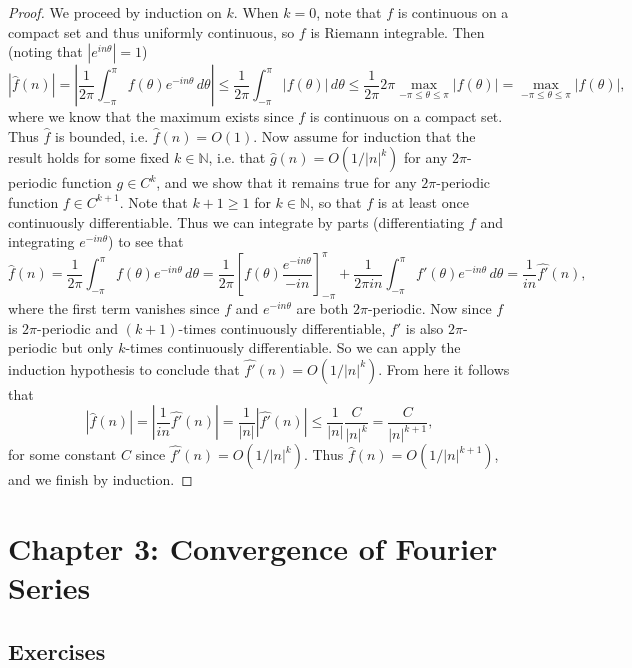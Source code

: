 \documentclass[letterpaper, 12pt]{article}
\newcommand{\N}{\mathbb{N}}
\begin{document}
\begin{proof}
  We proceed by induction on $k$. When $k = 0$, note that
  $f$ is continuous on a compact set and thus uniformly
  continuous, so $f$ is Riemann integrable. Then
  (noting that $|e^{in\theta}| = 1$)
  \[
    |\hat{f}(n)|
    = \left|\frac{1}{2\pi} \int_{-\pi}^{\pi} f(\theta) e^{-in\theta}\, d\theta \right|
    \le \frac{1}{2\pi} \int_{-\pi}^{\pi} |f(\theta)|\, d\theta
    \le \frac{1}{2\pi} 2\pi \max_{-\pi \le \theta \le \pi} |f(\theta)|
    = \max_{-\pi \le \theta \le \pi} |f(\theta)|,
  \]
  where we know that the maximum exists since $f$ is
  continuous on a compact set. Thus $\hat{f}$ is bounded,
  i.e. $\hat{f}(n) = O(1)$. Now assume for induction
  that the result
  holds for some fixed $k \in \N$, i.e.
  that $\hat{g}(n) = O(1 / |n|^k)$ for any $2\pi$-periodic
  function $g \in C^k$, and we show that
  it remains true for any $2\pi$-periodic function
  $f \in C^{k + 1}$. Note that $k + 1 \ge 1$ for
  $k \in \N$, so that
  $f$ is at least once continuously differentiable.
  Thus we can integrate by parts
  (differentiating $f$ and integrating $e^{-in\theta}$)
  to see that
  \[
    \hat{f}(n)
    = \frac{1}{2\pi} \int_{-\pi}^{\pi} f(\theta) e^{-in\theta}\, d\theta
    = \frac{1}{2\pi} \left[f(\theta) \frac{e^{-in\theta}}{-in}\right]_{-\pi}^{\pi}
    + \frac{1}{2\pi in} \int_{-\pi}^{\pi} f'(\theta) e^{-in\theta}\, d\theta
    = \frac{1}{in} \widehat{f'}(n),
  \]
  where the first term vanishes since
  $f$ and $e^{-in\theta}$ are both $2\pi$-periodic.
  Now since $f$ is $2\pi$-periodic and $(k + 1)$-times
  continuously differentiable, $f'$ is also
  $2\pi$-periodic but only $k$-times continuously
  differentiable. So we can apply the induction
  hypothesis to conclude that
  $\widehat{f'}(n) = O(1 / |n|^k)$. From here it follows
  that
  \[
    |\hat{f}(n)|
    = \left|\frac{1}{in} \widehat{f'}(n)\right|
    = \frac{1}{|n|} \left|\widehat{f'}(n)\right|
    \le \frac{1}{|n|} \frac{C}{|n|^{k}}
    = \frac{C}{|n|^{k + 1}},
  \]
  for some constant $C$ since
  $\widehat{f'}(n) = O(1 / |n|^k)$. Thus
  $\hat{f}(n) = O(1 / |n|^{k + 1})$,
  and we finish by induction.
\end{proof}

\pagebreak
\section{Chapter 3: Convergence of Fourier Series}
\subsection{Exercises}
\end{document}

